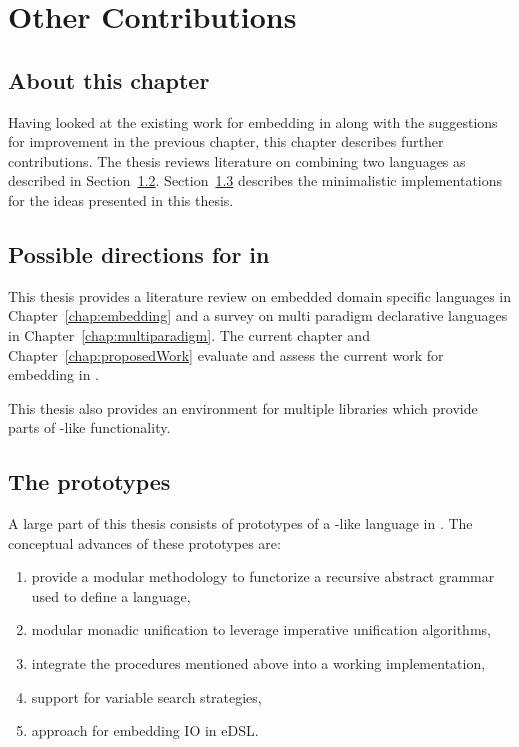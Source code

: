 \documentclass[thesis-solanki.tex]{subfiles}
\begin{document}
\chapter{Other Contributions}\label{chap:accomplishedWork}

\section{About this chapter}\label{sec:what-this-chapter:accomplishedWork}

Having looked at the existing work for embedding  in  along with the suggestions for improvement in the previous chapter, 
this chapter describes further contributions.
The thesis reviews literature on combining two languages as described in Section~\ref{sec:work-in-points}.
Section~\ref{sec:prototypes} describes the minimalistic implementations for the ideas presented in this thesis.

\section{Possible directions for  in }\label{sec:work-in-points}

This thesis provides a literature review on embedded domain specific languages in Chapter~\ref{chap:embedding} and a survey on
multi paradigm declarative languages in Chapter~\ref{chap:multiparadigm}. The current chapter and Chapter~\ref{chap:proposedWork} evaluate 
and assess the current work for embedding  in . 

This thesis also provides an environment for 
multiple  libraries which provide parts of -like functionality. 


\section{The prototypes}\label{sec:prototypes}
A large part of this thesis consists of prototypes of a -like language in . The conceptual advances of 
these prototypes are:
\begin{enumerate}
\item provide a modular methodology to functorize a recursive abstract grammar used to define a language,

\item modular monadic unification to leverage imperative unification algorithms,

\item integrate the procedures mentioned above into a working  implementation,

\item support for variable search strategies,

\item approach for embedding IO in eDSL.

\end{enumerate}
\end{document}
